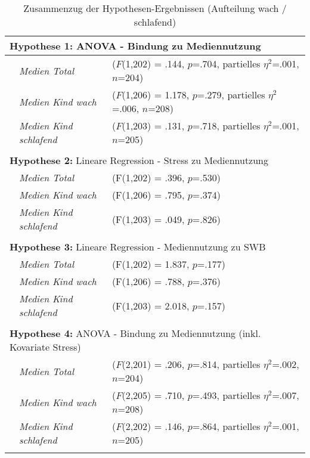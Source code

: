 \begin{table}[ht]
\begin{tabular}{l l  l }

  \multicolumn{3}{l}{\textbf{Hypothese 1:} ANOVA - Bindung zu Mediennutzung}\\
  \hline
  & \textit{Medien Total} & ($F$(1,202) = .144, $p$=.704, partielles $\eta^2$=.001, $n$=204)\\
  & \textit{Medien Kind wach} & ($F$(1,206) = 1.178, $p$=.279, partielles $\eta^2$=.006, $n$=208)\\
  & \textit{Medien Kind schlafend} & ($F$(1,203) = .131, $p$=.718, partielles $\eta^2$=.001, $n$=205)\\
  &&\\
  
  \multicolumn{3}{l}{\textbf{Hypothese 2:} Lineare Regression - Stress zu Mediennutzung}\\
  \hline
  & \textit{Medien Total} & (F(1,202) = .396, $p$=.530)\\
  & \textit{Medien Kind wach} & (F(1,206) = .795, $p$=.374)\\
  & \textit{Medien Kind schlafend} & (F(1,203) = .049, $p$=.826)\\
    &&\\
  
  \multicolumn{3}{l}{\textbf{Hypothese 3:} Lineare Regression - Mediennutzung zu SWB}\\
  \hline
  &\textit{Medien Total} & (F(1,202) = 1.837, $p$=.177)\\
  & \textit{Medien Kind wach} & (F(1,206) = .788, $p$=.376)\\
  & \textit{Medien Kind schlafend} & (F(1,203) = 2.018, $p$=.157)\\
  &&\\

  \multicolumn{3}{l}{\textbf{Hypothese 4:} ANOVA - Bindung zu Mediennutzung (inkl. Kovariate Stress)}\\
  \hline
  & \textit{Medien Total} & ($F$(2,201) = .206, $p$=.814, partielles $\eta^2$=.002, $n$=204)\\
  & \textit{Medien Kind wach} & ($F$(2,205) = .710, $p$=.493, partielles $\eta^2$=.007, $n$=208)\\
  & \textit{Medien Kind schlafend} & ($F$(2,202) = .146, $p$=.864, partielles $\eta^2$=.001, $n$=205)\\
  &&\\
\end{tabular}
\caption{Zusammenzug der Hypothesen-Ergebnissen (Aufteilung wach / schlafend)}
\label{table:AppZusammenzugResultate}
\end{table}